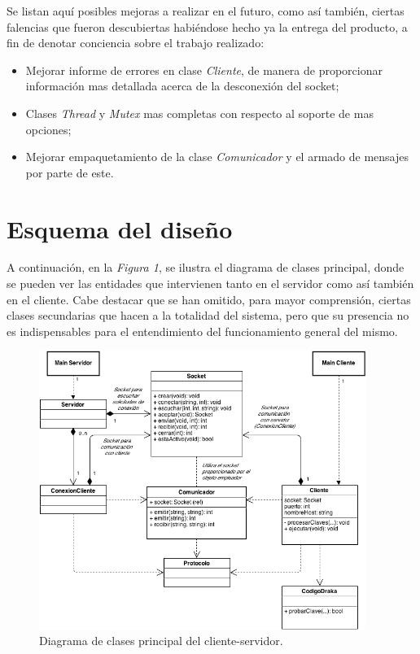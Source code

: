 \documentclass{article}
\begin{document}
	Se listan aquí posibles mejoras a realizar en el futuro, como así también, ciertas falencias que fueron descubiertas habiéndose hecho ya la entrega del producto, a fin de denotar conciencia sobre el trabajo realizado:

	\begin{itemize}
		\itemsep=3pt \topsep=0pt \partopsep=0pt \parskip=0pt \parsep=0pt

		\item Mejorar informe de errores en clase \textit{Cliente}, de manera de proporcionar información mas detallada acerca de la desconexión del socket;

		\item Clases \textit{Thread} y \textit{Mutex} mas completas con respecto al soporte de mas opciones;

		\item Mejorar empaquetamiento de la clase \textit{Comunicador} y el armado de mensajes por parte de este.

	\end{itemize}
	\bigskip
\newpage




\section{Esquema del diseño}

	A continuación, en la \textit{Figura 1}, se ilustra el diagrama de clases principal, donde se pueden ver las entidades que intervienen tanto en el
	servidor como así también en el cliente. Cabe destacar que se han omitido,
	para mayor comprensión, ciertas clases secundarias que hacen a la totalidad del sistema, pero que su presencia no es indispensables para el entendimiento del funcionamiento general del mismo. 
	\bigskip\bigskip\bigskip\bigskip


\begin{figure}[h]
	\centering
	\includegraphics[width=0.9465\textwidth]{images/diagrama_p1.png}
	\medskip
	\caption{Diagrama de clases principal del cliente-servidor.}
\end{figure}
\bigskip\bigskip\bigskip\bigskip
\end{document}
